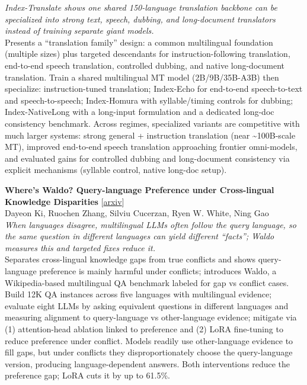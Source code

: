 \documentclass[12pt,letterpaper]{article}
\begin{document}
{\small\textit{Index-Translate shows one shared 150-language translation backbone can be specialized into strong text, speech, dubbing, and long-document translators instead of training separate giant models.}}\\[1pt]
{\footnotesize Presents a ``translation family'' design: a common multilingual foundation (multiple sizes) plus targeted descendants for instruction-following translation, end-to-end speech translation, controlled dubbing, and native long-document translation. Train a shared multilingual MT model (2B/9B/35B-A3B) then specialize: instruction-tuned translation; Index-Echo for end-to-end speech-to-text and speech-to-speech; Index-Homura with syllable/timing controls for dubbing; Index-NativeLong with a long-input formulation and a dedicated long-doc consistency benchmark. Across regimes, specialized variants are competitive with much larger systems: strong general + instruction translation (near \textasciitilde{}100B-scale MT), improved end-to-end speech translation approaching frontier omni-models, and evaluated gains for controlled dubbing and long-document consistency via explicit mechanisms (syllable control, native long-doc setup).}

\medskip

{\small\textbf{Where's Waldo? Query-language Preference under Cross-lingual Knowledge Disparities}} {\scriptsize[\href{https://arxiv.org/abs/2610.00606}{arxiv}]}\\
{\scriptsize Dayeon Ki, Ruochen Zhang, Silviu Cucerzan, Ryen W. White, Ning Gao}\\

{\small\textit{When languages disagree, multilingual LLMs often follow the query language, so the same question in different languages can yield different ``facts''; Waldo measures this and targeted fixes reduce it.}}\\[1pt]
{\footnotesize Separates cross-lingual knowledge gaps from true conflicts and shows query-language preference is mainly harmful under conflicts; introduces Waldo, a Wikipedia-based multilingual QA benchmark labeled for gap vs conflict cases. Build 12K QA instances across five languages with multilingual evidence; evaluate eight LLMs by asking equivalent questions in different languages and measuring alignment to query-language vs other-language evidence; mitigate via (1) attention-head ablation linked to preference and (2) LoRA fine-tuning to reduce preference under conflict. Models readily use other-language evidence to fill gaps, but under conflicts they disproportionately choose the query-language version, producing language-dependent answers. Both interventions reduce the preference gap; LoRA cuts it by up to 61.5\%.}
\end{document}
